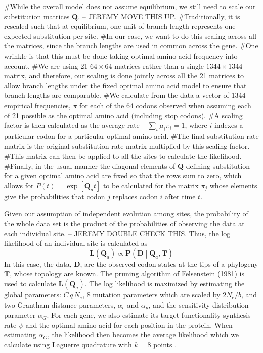 \documentclass{article}
\newcommand{\Ne}{\ensuremath{{N_e}}\xspace} %
\newcommand{\Pij}{\ensuremath{\pi_{j}}\xspace}
\newcommand{\Pmatrix}{\mathbf{P}\xspace}
\newcommand{\Tmatrix}{\mathbf{T}\xspace}
\newcommand{\Dmatrix}{\mathbf{D}\xspace}
\newcommand{\Lmatrix}{\mathbf{L}\xspace}
\newcommand{\Qmatrix}{\mathbf{Q}\xspace}
\newcommand{\Qmatrixa}{\ensuremath{\Qmatrix_a}\xspace}
\newcommand{\alphac}{\ensuremath{\alpha_c}\xspace}
\newcommand{\alphag}{\ensuremath{\alpha_G}\xspace}
\newcommand{\alphap}{\ensuremath{\alpha_p}\xspace}
\begin{document}
#While the overall model does not assume equilibrium, we still need to scale our substitution matrices $\Qmatrix$. -- JEREMY MOVE THIS UP.
#Traditionally, it is rescaled such that at equilibrium, one unit of branch length represents one expected substitution per site.
#In our case, we want to do this scaling across all the matrices, since the branch lengths are used in common across the gene.
#One wrinkle is that this must be done taking optimal amino acid frequency into account.
#We are using 21 $64 \times 64$ matrices rather than a single $1344 \times 1344$ matrix, and therefore, our scaling is done jointly across all the 21 matrices to allow branch lengths under the fixed optimal amino acid model to ensure that branch lengths are comparable.
#We calculate from the data a vector of 1344 empirical frequencies, $\pi$ for each of the 64 codons observed when assuming each of 21 possible as the optimal amino acid (including stop codons).
#A scaling factor is then calculated as the average rate $-\sum_i \mu_i \pi_i=1$, where $i$ indexes a particular codon for a particular optimal amino acid.
#The final substitution-rate matrix is the original substitution-rate matrix multiplied by this scaling factor.
#This matrix can then be applied to all the sites to calculate the likelihood.
#Finally, in the usual manner the diagonal elements of $\Qmatrix$ defining substitution for a given optimal amino acid are fixed so that the rows sum to zero, which allows for $P(t) = \exp\left[\Qmatrixa t\right]$ to be calculated for the matrix $\Pij$ whose elements give the probabilities that codon $j$ replaces codon $i$ after time $t$.

Given our assumption of independent evolution among sites, the probability of the whole data set is the product of the probabilities of observing the data at each individual site. -- JEREMY DOUBLE CHECK THIS.
Thus, the log likelihood of an individual site is calculated as
\begin{equation}
\Lmatrix\left(\Qmatrixa\right) \propto \Pmatrix\left(\Dmatrix\middle|\Qmatrixa,\Tmatrix\right)
\end{equation}
In this case, the data, $\Dmatrix$, are the observed codon states at the tips of a phylogeny $\Tmatrix$, whose topology are known.
The pruning algorithm of Felsenstein (1981) is used to calculate $\Lmatrix(\Qmatrixa)$.
The log likelihood is maximized by estimating the global parameters: $C \, q \, \Ne$, 8 mutation parameters which are scaled by $2 \Ne/b$, and two Grantham distance parameters, $\alphac$ and $\alphap$, and the sensitivity distribution parameter \alphag.
For each gene, we also estimate its target functionality synthesis rate $\psi$  and the optimal amino acid for each position in the protein.
When estimating \alphag, the likelihood then becomes the average likelihood which we calculate using Laguerre quadrature with $k = 8$ points  \citep{Yang1994,Felsenstein2001}.





\end{document}
